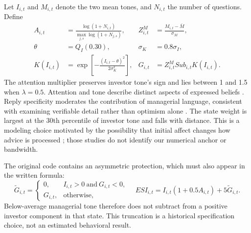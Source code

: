 Let $I_{i,t}$ and $M_{i,t}$ denote the two mean tones, and $N_{i,t}$ the number of questions. Define
\begin{align}
A_{i,t}&=\frac{\log(1+N_{i,t})}{\max_{j,s}\log(1+N_{j,s})}, & Z^M_{i,t}&=\frac{M_{i,t}-\bar M}{\sigma_M},\\
\theta&=Q_I(0.30), & \sigma_K&=0.8\sigma_I,\\
K(I_{i,t})&=\exp\!\left[-\frac{(I_{i,t}-\theta)^2}{2\sigma_K^2}\right], & G_{i,t}&=Z^M_{i,t}Sub_{i,t}K(I_{i,t}).
\end{align}
The attention multiplier preserves investor tone's sign and lies between 1 and 1.5 when $\lambda=0.5$. Attention and tone describe distinct aspects of expressed beliefs \citep{barber2008,da2011,cookson2024}. Reply specificity moderates the contribution of managerial language, consistent with examining verifiable detail rather than optimism alone \citep{hutton2003,hollander2010}. The state weight is largest at the 30th percentile of investor tone and falls with distance. This is a modeling choice motivated by the possibility that initial affect changes how advice is processed \citep{gino2012,loewenstein2001risk}; those studies do not identify our numerical anchor or bandwidth.

The original code contains an asymmetric protection, which must also appear in the written formula:
\begin{equation}
\widetilde G_{i,t}=\begin{cases}0,& I_{i,t}>0\ \text{and}\ G_{i,t}<0,\\G_{i,t},&\text{otherwise},\end{cases}
\quad ESI_{i,t}=I_{i,t}(1+0.5A_{i,t})+5\widetilde G_{i,t}.\label{eq:esi}
\end{equation}
Below-average managerial tone therefore does not subtract from a positive investor component in that state. This truncation is a historical specification choice, not an estimated behavioral result.

